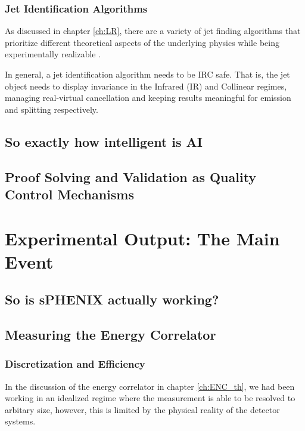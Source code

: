 \documentclass[letterpaper, 12pt, oneside]{book}
\theoremstyle{definition}
\begin{document}
\section{Jet Identification Algorithms}
\label{sec:toy_jet_id}
As discussed in chapter \ref{ch:LR}, there are a variety of jet finding algorithms that prioritize different theoretical aspects of the underlying physics while being experimentally realizable \cite{Dokshitzer1997} \cite{Atkin2015}. 

In general, a jet identification algorithm needs to be IRC safe. 
That is, the jet object needs to display invariance in the Infrared (IR) and Collinear regimes, managing real-virtual cancellation and keeping results meaningful for emission and splitting respectively. 

\chapter{So exactly how intelligent is AI}
\chapter{Proof Solving and Validation as Quality Control Mechanisms}
\part{Experimental Output: The Main Event}
\chapter{So is sPHENIX actually working?}
\chapter{Measuring the Energy Correlator}
	\section{Discretization and Efficiency}
	In the discussion of the energy correlator in chapter \ref{ch:ENC_th}, we had been working in an idealized regime where the measurement is able to be resolved to arbitary size, however, this is limited by the physical reality of the detector systems.
\end{document}
